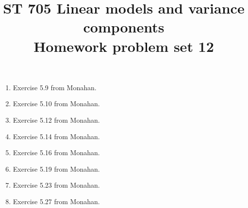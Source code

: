 \documentclass[11pt]{article}
\title{ST 705 Linear models and variance components \\ 
        Homework problem set 12}
\begin{document}
\maketitle

\begin{enumerate}

\item Exercise 5.9 from Monahan.

\item Exercise 5.10 from Monahan.

\item Exercise 5.12 from Monahan.

\item Exercise 5.14 from Monahan.

\item Exercise 5.16 from Monahan.

\item Exercise 5.19 from Monahan.

\item Exercise 5.23 from Monahan.

\item Exercise 5.27 from Monahan.






\end{enumerate}
\end{document}
